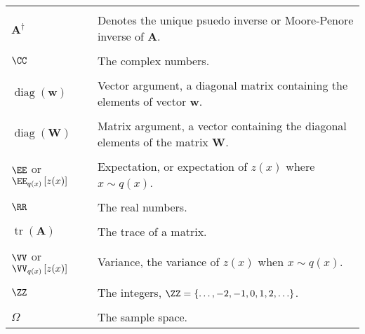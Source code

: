 \begin{longtable}{lp{}}
    \\\\
    $\bm{A}^{\dagger}$                                & Denotes the unique psuedo inverse or Moore-Penore inverse of $\bm{A}$.
    \\\\
    $\CC$                                             & The complex numbers.
    \\\\
    $\operatorname{diag} \left( \bm{w} \right)$       & Vector argument, a diagonal matrix containing the elements of vector $\bm{w}$.
    \\\\
    $\operatorname{diag} \left( \bm{W} \right)$       & Matrix argument, a vector containing the diagonal elements of the matrix $\bm{W}$.
    \\\\
    $\EE$ or $\EE_{q(x)} \left[ z(x) \right]$         & Expectation, or expectation of $z(x)$ where $x \sim q(x)$.
    \\\\
    $\RR$                                             & The real numbers.
    \\\\
    $\operatorname{tr} \left( \bm{A} \right)$         & The trace of a matrix.
    \\\\
    $\VV$ or $\VV_{q(x)} \left[ z(x) \right]$         & Variance, the variance of $z(x)$ when $x \sim q(x)$.
    \\\\
    $\ZZ$                                             & The integers, $\ZZ = \left\{ \ldots ,-2,-1,0,1,2,\ldots \right\}$.
    \\\\
    $\Omega$                                          & The sample space.

    \\\bottomrule
    \hline
\end{longtable}
